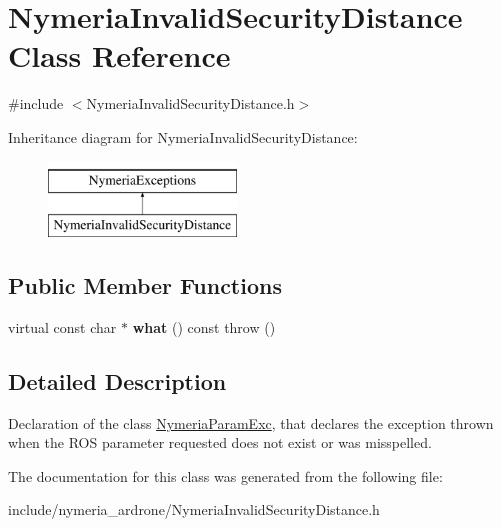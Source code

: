 \hypertarget{classNymeriaInvalidSecurityDistance}{\section{\-Nymeria\-Invalid\-Security\-Distance \-Class \-Reference}
\label{classNymeriaInvalidSecurityDistance}
}


{\ttfamily \#include $<$\-Nymeria\-Invalid\-Security\-Distance.\-h$>$}

\-Inheritance diagram for \-Nymeria\-Invalid\-Security\-Distance\-:\begin{figure}[H]
\begin{center}
\leavevmode
\includegraphics[height=2.000000cm]{classNymeriaInvalidSecurityDistance}
\end{center}
\end{figure}
\subsection*{\-Public \-Member \-Functions}
\begin{DoxyCompactItemize}
\item 
\hypertarget{classNymeriaInvalidSecurityDistance_adf2ed913aa00ca68f37c6eb794b161ca}{virtual const char $\ast$ {\bfseries what} () const   throw ()}\label{classNymeriaInvalidSecurityDistance_adf2ed913aa00ca68f37c6eb794b161ca}

\end{DoxyCompactItemize}


\subsection{\-Detailed \-Description}
\-Declaration of the class \hyperlink{classNymeriaParamExc}{\-Nymeria\-Param\-Exc}, that declares the exception thrown when the \-R\-O\-S parameter requested does not exist or was misspelled. 

\-The documentation for this class was generated from the following file\-:\begin{DoxyCompactItemize}
\item 
include/nymeria\-\_\-ardrone/\-Nymeria\-Invalid\-Security\-Distance.\-h\end{DoxyCompactItemize}
